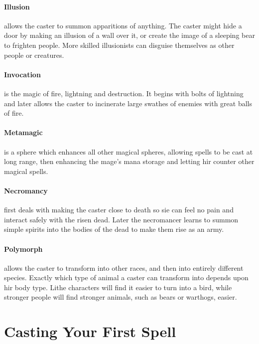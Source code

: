 \documentclass[titlepage,a4paper,openany]{book}
\begin{document}
\begin{multicols}{2}
\paragraph{Illusion} allows the caster to summon apparitions of anything. The caster might hide a door by making an illusion of a wall over it, or create the image of a sleeping bear to frighten people. More skilled illusionists can disguise themselves as other people or creatures.

\paragraph{Invocation} is the magic of fire, lightning and destruction. It begins with bolts of lightning and later allows the caster to incinerate large swathes of enemies with great balls of fire.

\paragraph{Metamagic} is a sphere which enhances all other magical spheres, allowing spells to be cast at long range, then enhancing the mage's mana storage and letting hir counter other magical spells.

\paragraph{Necromancy} first deals with making the caster close to death so sie can feel no pain and interact safely with the risen dead. Later the necromancer learns to summon simple spirits into the bodies of the dead to make them rise as an army.

\paragraph{Polymorph} allows the caster to transform into other races, and then into entirely different species. Exactly which type of animal a caster can transform into depends upon hir body type. Lithe characters will find it easier to turn into a bird, while stronger people will find stronger animals, such as bears or warthogs, easier.

\end{multicols}

\section{Casting Your First Spell}
\end{document}
